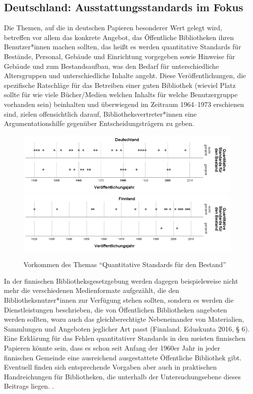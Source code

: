 \documentclass[a4paper,
fontsize=11pt,
oneside,
numbers=noperiodatend,
parskip=half-,
bibliography=totoc,
final
]{scrartcl}
\begin{document}
\hypertarget{deutschland-ausstattungsstandards-im-fokus}{%
\subsection{Deutschland: Ausstattungsstandards im
Fokus}\label{deutschland-ausstattungsstandards-im-fokus}}

Die Themen, auf die in deutschen Papieren besonderer Wert gelegt wird,
betreffen vor allem das konkrete Angebot, das Öffentliche Bibliotheken
ihren Benutzer*innen machen sollten, das heißt es werden quantitative
Standards für Bestände, Personal, Gebäude und Einrichtung vorgegeben
sowie Hinweise für Gebäude und zum Bestandsaufbau, was den Bedarf für
unterschiedliche Altersgruppen und unterschiedliche Inhalte angeht.
Diese Veröffentlichungen, die spezifische Ratschläge für das Betreiben
einer guten Bibliothek (wieviel Platz sollte für wie viele Bücher/Medien
welchen Inhalts für welche Benutzergruppe vorhanden sein) beinhalten und
überwiegend im Zeitraum 1964--1973 erschienen sind, zielen
offensichtlich darauf, Bibliotheksvertreter*innen eine
Argumentationshilfe gegenüber Entscheidungsträgern zu geben.

\begin{figure}
\centering
\includegraphics{img/abb_3_de.png} 
\includegraphics{img/abb_3_fin.png}
\caption{Vorkommen des Themas \enquote{Quantitative Standards für den Bestand}}
\end{figure}


In der finnischen Bibliotheksgesetzgebung werden dagegen beispielsweise
nicht mehr die verschiedenen Medienformate aufgezählt, die den
Bibliotheksnutzer*innen zur Verfügung stehen sollten, sondern es werden
die Dienstleistungen beschrieben, die von Öffentlichen Bibliotheken
angeboten werden sollten, wozu auch das gleichberechtigte Nebeneinander
von Materialien, Sammlungen und Angeboten jeglicher Art passt (Finnland.
Eduskunta 2016, § 6). Eine Erklärung für das Fehlen quantitativer
Standards in den meisten finnischen Papieren könnte sein, dass es schon
seit Anfang der 1960er Jahr in jeder finnischen Gemeinde eine
ausreichend ausgestattete Öffentliche Bibliothek gibt. Eventuell finden
sich entsprechende Vorgaben aber auch in praktischen Handreichungen für
Bibliotheken, die unterhalb der Untersuchungsebene dieses Beitrags
liegen. .
\end{document}
